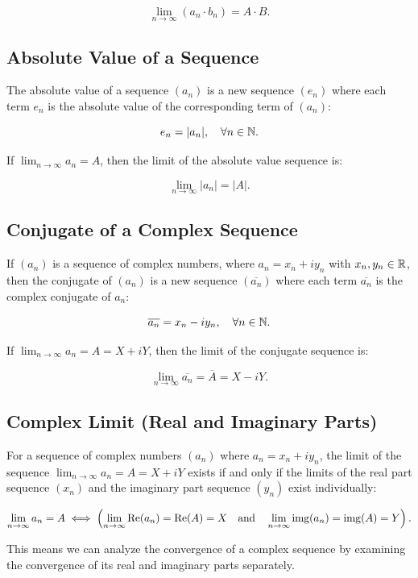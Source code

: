 \[
	\lim_{n \to \infty} (a_n \cdot b_n) = A \cdot B.
\]

\subsection{Absolute Value of a Sequence}

The absolute value of a sequence \((a_n)\) is a new sequence \((e_n)\) where each term \(e_n\) is the absolute value of the corresponding term of \((a_n)\):

\[
	e_n = |a_n|, \quad \forall n \in \mathbb{N}.
\]

If \(\lim_{n \to \infty} a_n = A\), then the limit of the absolute value sequence is:

\[
	\lim_{n \to \infty} |a_n| = |A|.
\]

\subsection{Conjugate of a Complex Sequence}

If \((a_n)\) is a sequence of complex numbers, where \(a_n = x_n + i y_n\) with \(x_n, y_n \in \mathbb{R}\), then the conjugate of \((a_n)\) is a new sequence \((\overline{a_n})\)
where each term \(\overline{a_n}\) is the complex conjugate of \(a_n\):

\[
	\overline{a_n} = x_n - i y_n, \quad \forall n \in \mathbb{N}.
\]

If \(\lim_{n \to \infty} a_n = A = X + i Y\), then the limit of the conjugate sequence is:

\[
	\lim_{n \to \infty} \overline{a_n} = \overline{A} = X - i Y.
\]

\subsection{Complex Limit (Real and Imaginary Parts)}

For a sequence of complex numbers \((a_n)\) where \(a_n = x_n + i y_n\), the limit of the sequence
\(\lim_{n \to \infty} a_n = A = X + i Y\) exists if and only if the limits of the real part sequence
\((x_n)\) and the imaginary part sequence \((y_n)\) exist individually:

\[
	\lim_{n \to \infty} a_n = A \iff \left( \lim_{n \to \infty} \text{Re}(a_n) = \text{Re}(A) = X \quad \text{and} \quad \lim_{n \to \infty} \mathrm{img}(a_n) = \mathrm{img}(A) = Y \right).
\]

This means we can analyze the convergence of a complex sequence by examining the convergence of its real
and imaginary parts separately.

